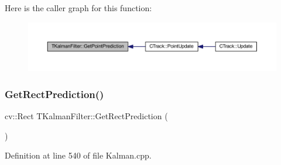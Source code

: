 Here is the caller graph for this function\+:\nopagebreak
\begin{figure}[H]
\begin{center}
\leavevmode
\includegraphics[width=350pt]{class_t_kalman_filter_a103fb495ee14ff2be7a29053695ce7d1_icgraph}
\end{center}
\end{figure}
\mbox{\label{class_t_kalman_filter_af112feed15a064055987a1faedf9673d}} 
\subsubsection{\texorpdfstring{Get\+Rect\+Prediction()}{GetRectPrediction()}}
{\footnotesize\ttfamily cv\+::\+Rect T\+Kalman\+Filter\+::\+Get\+Rect\+Prediction (\begin{DoxyParamCaption}{ }\end{DoxyParamCaption})}



Definition at line 540 of file Kalman.\+cpp.


